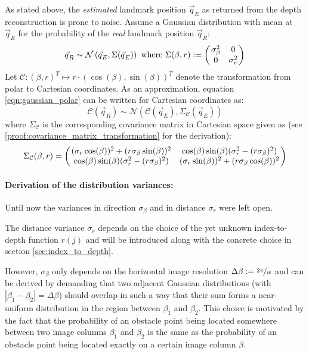 As stated above, the \textit{estimated} landmark position $\vec q_E$ as returned from the depth reconstruction is prone to noise. Assume a Gaussian distribution with mean at $\vec q_E$ for the probability of the \textit{real} landmark position $\vec q_R$:
\begin{equation}
  \vec q_R \sim \mathcal{N}\left(\vec q_E, \Sigma(\vec q_E) \right) \text{ where } \Sigma(\beta, r) := \begmat \sigma_\beta^2 & 0 \\ 0 & \sigma_r^2 \finmat
  \label{eqn:gaussian_polar}
\end{equation}
Let $\mathcal{C} : (\beta, r)^T \mapsto r \cdot (\cos(\beta), \sin(\beta))^T$ denote the transformation from polar to Cartesian coordinates. As an approximation, equation \ref{eqn:gaussian_polar} can be written for Cartesian coordinates as:
\begin{equation}
  \mathcal{C}(\vec q_R) \sim \mathcal{N}\left(\mathcal{C}(\vec q_E), \Sigma_{\mathcal{C}}(\vec q_E)\right)
\end{equation}
where $\Sigma_{\mathcal{C}}$ is the corresponding covariance matrix in Cartesian space given as (see \ref{proof:covariance_matrix_transformation} for the derivation):
\begin{equation}
  \Sigma_{\mathcal{C}}(\beta, r) = \left( \left. \begin{matrix}
    (\sigma_r \cos(\beta))^2 + (r \sigma_\beta \sin(\beta))^2 & \cos(\beta) \sin(\beta) (\sigma_r^2 - (r \sigma_\beta)^2) \\
    \cos(\beta) \sin(\beta) (\sigma_r^2 - (r \sigma_\beta)^2) & (\sigma_r \sin(\beta))^2 + (r \sigma_\beta \cos(\beta))^2
  \end{matrix}\right. \right)
  \label{eqn:cartesian_covariance}
\end{equation}


\paragraph{Derivation of the distribution variances:} Until now the variances in  direction $\sigma_\beta$ and in distance $\sigma_r$ were left open.

The distance variance $\sigma_r$ depends on the choice of the yet unknown index-to-depth function $r(j)$ and will be introduced along with the concrete choice in section \ref{sec:index_to_depth}.

However, $\sigma_\beta$ only depends on the horizontal image resolution $\Delta \beta := \nicefrac{2\pi}w$ and can be derived by demanding that two adjacent Gaussian distributions (with $| \beta_1 - \beta_2 | = \Delta \beta$) should overlap in such a way that their sum forms a near-uniform distribution in the region between $\beta_1$ and $\beta_2$. This choice is motivated by the fact that the probability of an obstacle point being located somewhere between two image columns $\beta_1$ and $\beta_2$ is the same as the probability of an obstacle point being located exactly on a certain image column $\beta$.


